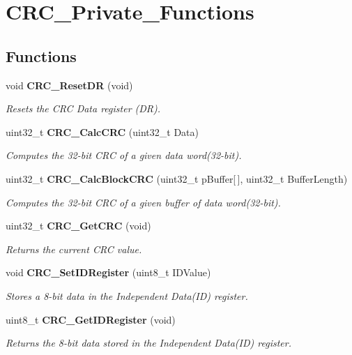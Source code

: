 \section{C\+R\+C\+\_\+\+Private\+\_\+\+Functions}
\label{group__CRC__Private__Functions}
\subsection*{Functions}
\begin{DoxyCompactItemize}
\item 
void \textbf{ C\+R\+C\+\_\+\+Reset\+DR} (void)
\begin{DoxyCompactList}\small\item\em Resets the C\+RC Data register (DR). \end{DoxyCompactList}\item 
uint32\+\_\+t \textbf{ C\+R\+C\+\_\+\+Calc\+C\+RC} (uint32\+\_\+t Data)
\begin{DoxyCompactList}\small\item\em Computes the 32-\/bit C\+RC of a given data word(32-\/bit). \end{DoxyCompactList}\item 
uint32\+\_\+t \textbf{ C\+R\+C\+\_\+\+Calc\+Block\+C\+RC} (uint32\+\_\+t p\+Buffer[$\,$], uint32\+\_\+t Buffer\+Length)
\begin{DoxyCompactList}\small\item\em Computes the 32-\/bit C\+RC of a given buffer of data word(32-\/bit). \end{DoxyCompactList}\item 
uint32\+\_\+t \textbf{ C\+R\+C\+\_\+\+Get\+C\+RC} (void)
\begin{DoxyCompactList}\small\item\em Returns the current C\+RC value. \end{DoxyCompactList}\item 
void \textbf{ C\+R\+C\+\_\+\+Set\+I\+D\+Register} (uint8\+\_\+t I\+D\+Value)
\begin{DoxyCompactList}\small\item\em Stores a 8-\/bit data in the Independent Data(\+I\+D) register. \end{DoxyCompactList}\item 
uint8\+\_\+t \textbf{ C\+R\+C\+\_\+\+Get\+I\+D\+Register} (void)
\begin{DoxyCompactList}\small\item\em Returns the 8-\/bit data stored in the Independent Data(\+I\+D) register. \end{DoxyCompactList}\end{DoxyCompactItemize}


